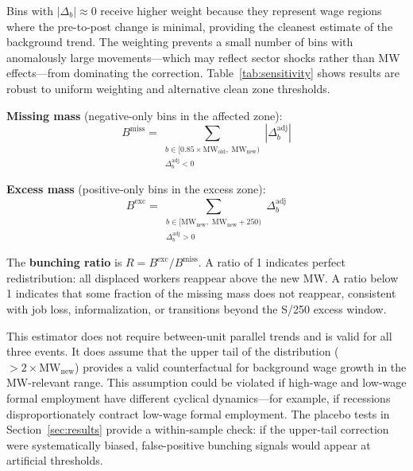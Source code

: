 \documentclass[12pt]{article}
\begin{document}
Bins with $|\Delta_b| \approx 0$ receive higher weight because they represent wage regions where the pre-to-post change is minimal, providing the cleanest estimate of the background trend. The weighting prevents a small number of bins with anomalously large movements---which may reflect sector shocks rather than MW effects---from dominating the correction. Table~\ref{tab:sensitivity} shows results are robust to uniform weighting and alternative clean zone thresholds.

\textbf{Missing mass} (negative-only bins in the affected zone):
\begin{equation}
B^\text{miss} = \sum_{\substack{b \in [0.85 \times \text{MW}_\text{old},\; \text{MW}_\text{new}) \\ \Delta_b^\text{adj} < 0}} \left| \Delta_b^\text{adj} \right|
\end{equation}

\textbf{Excess mass} (positive-only bins in the excess zone):
\begin{equation}
B^\text{exc} = \sum_{\substack{b \in [\text{MW}_\text{new},\; \text{MW}_\text{new} + 250) \\ \Delta_b^\text{adj} > 0}} \Delta_b^\text{adj}
\end{equation}

The \textbf{bunching ratio} is $R = B^\text{exc} / B^\text{miss}$. A ratio of 1 indicates perfect redistribution: all displaced workers reappear above the new MW. A ratio below 1 indicates that some fraction of the missing mass does not reappear, consistent with job loss, informalization, or transitions beyond the S/250 excess window.

This estimator does not require between-unit parallel trends and is valid for all three events. It does assume that the upper tail of the distribution ($> 2 \times \text{MW}_\text{new}$) provides a valid counterfactual for background wage growth in the MW-relevant range. This assumption could be violated if high-wage and low-wage formal employment have different cyclical dynamics---for example, if recessions disproportionately contract low-wage formal employment. The placebo tests in Section~\ref{sec:results} provide a within-sample check: if the upper-tail correction were systematically biased, false-positive bunching signals would appear at artificial thresholds.
\end{document}
